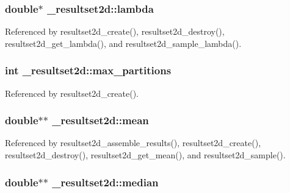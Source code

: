 \subsubsection[{\texorpdfstring{lambda}{lambda}}]{\setlength{\rightskip}{0pt plus 5cm}double$\ast$ \+\_\+resultset2d\+::lambda}\hypertarget{struct__resultset2d_a19dd297dae229caefc82c40f7204d126}{}\label{struct__resultset2d_a19dd297dae229caefc82c40f7204d126}


Referenced by resultset2d\+\_\+create(), resultset2d\+\_\+destroy(), resultset2d\+\_\+get\+\_\+lambda(), and resultset2d\+\_\+sample\+\_\+lambda().

\subsubsection[{\texorpdfstring{max\+\_\+partitions}{max_partitions}}]{\setlength{\rightskip}{0pt plus 5cm}int \+\_\+resultset2d\+::max\+\_\+partitions}\hypertarget{struct__resultset2d_a78b12c8187bf99b00cc87944a65860e6}{}\label{struct__resultset2d_a78b12c8187bf99b00cc87944a65860e6}


Referenced by resultset2d\+\_\+create().

\subsubsection[{\texorpdfstring{mean}{mean}}]{\setlength{\rightskip}{0pt plus 5cm}double$\ast$$\ast$ \+\_\+resultset2d\+::mean}\hypertarget{struct__resultset2d_a681bb42e2518e953b71e899bade3af95}{}\label{struct__resultset2d_a681bb42e2518e953b71e899bade3af95}


Referenced by resultset2d\+\_\+assemble\+\_\+results(), resultset2d\+\_\+create(), resultset2d\+\_\+destroy(), resultset2d\+\_\+get\+\_\+mean(), and resultset2d\+\_\+sample().

\subsubsection[{\texorpdfstring{median}{median}}]{\setlength{\rightskip}{0pt plus 5cm}double$\ast$$\ast$ \+\_\+resultset2d\+::median}\hypertarget{struct__resultset2d_aace30f7a8061365973da8a7bd37628c7}{}\label{struct__resultset2d_aace30f7a8061365973da8a7bd37628c7}


